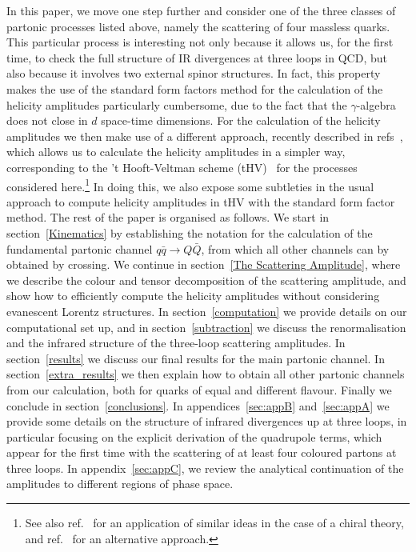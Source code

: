 In this paper, we move one step further and consider one of the three classes of partonic processes  listed above, 
namely the scattering of four massless quarks. This particular process is interesting not only
because it allows us, for the first time, to check the full structure of IR divergences at three loops in QCD, 
but also because it involves two external spinor structures. In fact, this property makes the use of the standard form factors
method for the calculation of the helicity amplitudes particularly cumbersome, due to the fact that the  $\gamma$-algebra does not
close in  $d$ space-time dimensions. For the calculation of the helicity amplitudes we then make use of
a different approach, recently described in refs~\cite{Peraro:2019cjj,Peraro:2020sfm}, which allows us to calculate the helicity amplitudes
in a simpler way, corresponding to the 't Hooft-Veltman scheme (tHV)~\cite{tHooft:1972tcz} for the processes considered here.\footnote{See also ref.~\cite{Heller:2020owb} for an application of similar ideas in the case of a chiral theory, and ref.~\cite{Chen:2019wyb} for an alternative approach.} 
In doing this, we also expose some
subtleties in the usual approach to compute helicity amplitudes in 
tHV with the standard form factor method.
The rest of the paper is organised as follows. 
We start in section~\ref{Kinematics} by establishing the notation for the calculation of the
fundamental partonic channel $q\bar{q} \to Q \bar{Q}$, from which all other channels can by obtained by crossing.
We continue in section~\ref{The Scattering Amplitude},
where we describe the colour and tensor decomposition  of the scattering amplitude, and show how to 
efficiently compute the helicity amplitudes without considering evanescent Lorentz structures.
In section~\ref{computation} we provide details on our computational set up,
and in section~\ref{subtraction} we discuss the renormalisation and the infrared structure of the three-loop scattering amplitudes.
In section~\ref{results} we discuss our final results for the main partonic channel.
In section~\ref{extra_results} we then explain how to obtain all other partonic channels from our calculation, both for quarks of equal and different flavour.
Finally we conclude in section~\ref{conclusions}.  In 
appendices~\ref{sec:appB} and~\ref{sec:appA}
we provide some details on the structure of infrared divergences up at three loops, in particular focusing on the explicit derivation of the quadrupole terms, which appear for the first time with the scattering of at least four coloured partons at three loops.
In appendix~\ref{sec:appC}, we review the analytical continuation of the amplitudes to different regions of phase space.
